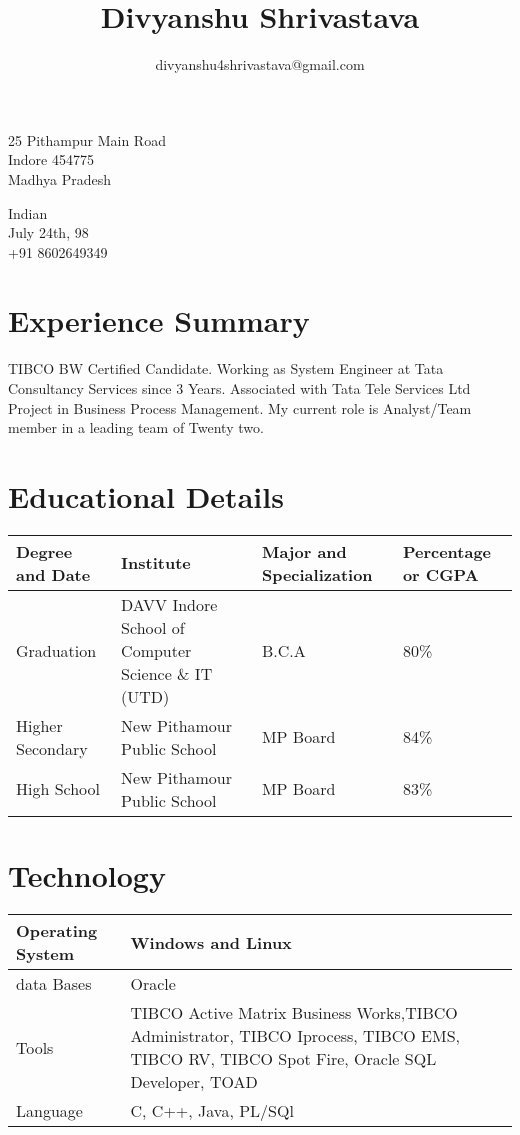\documentclass{article}
\title{\bfseries\Huge Divyanshu Shrivastava }
\author{divyanshu4shrivastava@gmail.com}
\begin{document}
\maketitle


\begin{minipage}{0.78\textwidth}
25 Pithampur Main Road \\
Indore 454775\\
Madhya Pradesh
\end{minipage}
\begin{minipage}{0.48\textwidth}
Indian\\
July 24th, 98\\
+91 8602649349
\end{minipage}

\section{Experience Summary}
TIBCO BW Certified Candidate. Working as System Engineer at
Tata Consultancy Services since 3 Years. Associated with Tata Tele Services Ltd Project in Business
Process Management. My current role is Analyst/Team member in a leading team of Twenty two.


\renewcommand{\arraystretch}{2.5}
\section{Educational Details}
\begin{tabular}{ |p{3cm}|p{7cm}|p{2.5cm}|p{2cm}|}
\hline
Degree and Date & Institute & Major and Specialization & Percentage or CGPA \\
\hline
Graduation & DAVV Indore School of Computer Science \& IT (UTD) & B.C.A & 80\% \\
\hline
Higher Secondary & New Pithamour Public School & MP Board & 84\% \\
\hline
High School & New Pithamour Public School & MP Board & 83\% \\
\hline
\end{tabular}



\renewcommand{\arraystretch}{2.5}
\section{Technology}
\begin{tabular}{ |p{3cm}|p{11.5cm}|}
\hline
Operating System & Windows and Linux\\
\hline
data Bases & Oracle \\
\hline
Tools & TIBCO Active Matrix Business Works,TIBCO Administrator, TIBCO Iprocess, TIBCO EMS, TIBCO RV, TIBCO Spot Fire, Oracle SQL Developer, TOAD \\
\hline
Language & C, C++, Java, PL/SQl \\
\hline
\end{tabular}
\end{document}

